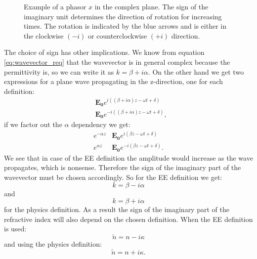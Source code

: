 \begin{figure}[h]
    \centering
    
    \caption{Example of a phasor $x$ in the complex plane. The sign of the imaginary unit determines the direction of rotation for increasing times. The rotation is indicated by the blue arrows and is either in the clockwise $(-i)$ or counterclockwise $(+i)$ direction.}
    \label{fig:phasor}
\end{figure}

The choice of sign has other implications. We know from equation \ref{eq:wavevector_req} that the wavevector is in general complex because the permittivity is, so we can write it as $k=\beta + i \alpha$. On the other hand we get two expressions for a plane wave propagating in the z-direction, one for each definition:
\begin{align}
    &\bm{E_{0}}e^{i((\beta + i \alpha)z-\omega t + \delta)} \\
    &\bm{E_{0}}e^{-i((\beta + i \alpha)z-\omega t + \delta)}, 
\end{align}
if we factor out the $\alpha$ dependency we get:
\begin{align}
    e^{-\alpha z}&\bm{E_{0}}e^{i(\beta z-\omega t + \delta)} \\
    e^{\alpha z}&\bm{E_{0}}e^{-i(\beta z-\omega t + \delta)}. 
\end{align}
We see that in case of the EE definition the amplitude would increase as the wave propagates, which is nonsense. Therefore the sign of the imaginary part of the wavevector must be chosen accordingly. So for the EE definition we get:
\begin{equation}
    k=\beta - i \alpha
\end{equation}
and 
\begin{equation}
    k=\beta + i \alpha
\end{equation}
for the physics definition.
As a result the sign of the imaginary part of the refractive index will also depend on the chosen definition. When the EE definition is used:
\begin{equation}
    \tilde{n}= n - i \kappa
\end{equation}
and using the physics definition:  
\begin{equation}
    \tilde{n}= n + i \kappa.
\end{equation}

